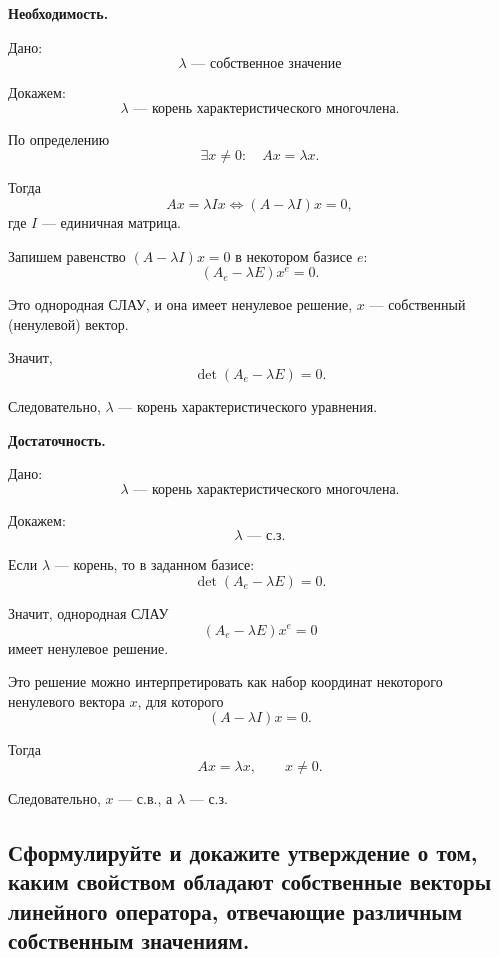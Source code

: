 \begin{Proof}
    {\bf Необходимость.}
    
    Дано:
    \[
        \lambda \text{ --- собственное значение}
    \]
    
    Докажем:
    \[
        \lambda \text{ --- корень характеристического многочлена.}
    \]
    
    По определению
    \[
        \exists x \neq 0:\quad Ax = \lambda x.
    \]
    
    Тогда
    \[
        Ax = \lambda I x
        \Longleftrightarrow
        (A-\lambda I)x = 0,
    \]
    где $I$ --- единичная матрица.
    
    Запишем равенство $(A-\lambda I)x=0$ в некотором базисе $e$:
    \[
        (A_e-\lambda E)x^e = 0.
    \]
    
    Это однородная СЛАУ, и она имеет ненулевое решение, $x$ --- собственный (ненулевой) вектор.
    
    Значит,
    \[
        \det(A_e-\lambda E)=0.
    \]
    
    Следовательно, $\lambda$ --- корень характеристического уравнения.
    
    \bigskip
    
    {\bf Достаточность.}
    
    Дано:
    \[
        \lambda \text{ --- корень характеристического многочлена.}
    \]
    
    Докажем:
    \[
        \lambda \text{ --- с.з.}
    \]
    
    Если $\lambda$ --- корень, то в заданном базисе:
    \[
        \det(A_e-\lambda E)=0.
    \]
    
    Значит, однородная СЛАУ
    \[
        (A_e-\lambda E)x^e=0
    \]
    имеет ненулевое решение.
    
    Это решение можно интерпретировать как набор координат некоторого ненулевого вектора $x$, для которого
    \[
        (A-\lambda I)x=0.
    \]
    
    Тогда
    \[
        Ax=\lambda x,\qquad x\neq 0.
    \]
    
    Следовательно, $x$ --- с.в., а $\lambda$ --- с.з.
\end{Proof}

\subsection{Сформулируйте и докажите утверждение о том, каким свойством обладают собственные векторы линейного оператора, отвечающие различным собственным значениям.}

